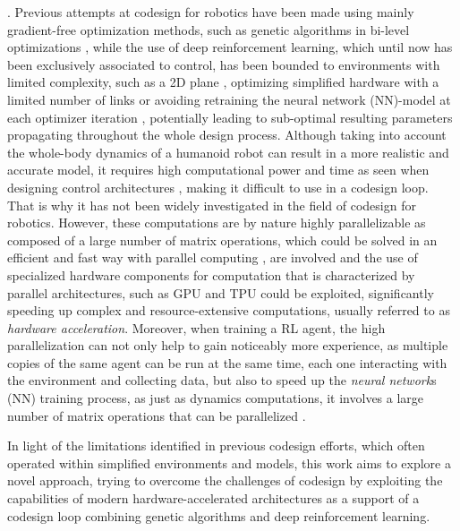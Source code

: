 . Previous attempts at codesign for robotics have been made using mainly gradient-free optimization methods, such as genetic algorithms in bi-level optimizations \citep{sartore_optimization_2022,fadini_simulation_2022}, while the use of deep reinforcement learning, which until now has been exclusively associated to control, has been bounded to environments with limited complexity, such as a 2D plane \citep{ha_reinforcement_2019}, optimizing simplified hardware with a limited number of links \citep{chen_hardware_2020} or avoiding retraining the neural network (\ac{NN})-model at each optimizer iteration \citep{bjelonic_learning-based_2023}, potentially leading to sub-optimal resulting parameters propagating throughout the whole design process. Although taking into account the whole-body dynamics of a humanoid robot can result in a more realistic and accurate model, it requires high computational power and time as seen when designing control architectures \citep{ramuzat_benchmarking_2022}, making it difficult to use in a codesign loop. That is why it has not been widely investigated in the field of codesign for robotics. However, these computations are by nature highly parallelizable as composed of a large number of matrix operations, which could be solved in an efficient and fast way with parallel computing \citep{gyawali_comparative_2023, tuma_2023}, are involved and the use of specialized hardware components for computation that is characterized by parallel architectures, such as \ac{GPU} and \ac{TPU} could be exploited, significantly speeding up complex and resource-extensive computations, usually referred to as \textit{hardware acceleration}. Moreover, when training a \ac{RL} agent, the high parallelization can not only help to gain noticeably more experience, as multiple copies of the same agent can be run at the same time, each one interacting with the environment and collecting data, but also to speed up the \textit{neural network}s (\ac{NN}) training process, as just as dynamics computations, it involves a large number of matrix operations that can be parallelized \citep{pandey_transformational_2022,gyawali_comparative_2023}.

In light of the limitations identified in previous codesign efforts, which often operated within simplified environments and models, this work aims to explore a novel approach, trying to overcome the challenges of codesign by exploiting the capabilities of modern hardware-accelerated architectures as a support of a codesign loop combining genetic algorithms and deep reinforcement learning.

